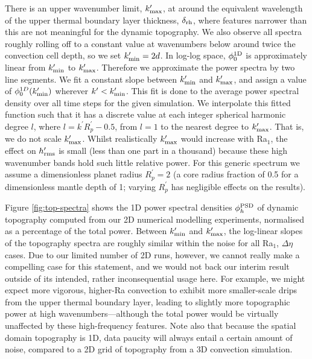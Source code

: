There is an upper wavenumber limit, $k^\prime_{\rm max}$, at around the equivalent wavelength of the upper thermal boundary layer thickness, $\delta_{\rm rh}$, where features narrower than this are not meaningful for the dynamic topography. We also observe all spectra roughly rolling off to a constant value at wavenumbers below around twice the convection cell depth, so we set $k_{\rm min}^\prime = 2d$. In log-log space, $\phi^{\rm 1D}_0$ is approximately linear from $k_{\rm min}^\prime$ to $k^\prime_{\rm max}$. Therefore we approximate the power spectra by two line segments. We fit a constant slope between $k^\prime_{\rm min}$ and $k^\prime_{\rm max}$, and assign a value of $\phi^{1D}_0(k^\prime_{\rm min})$ wherever $k^\prime < k^\prime_{\rm min}$. This fit is done to the average power spectral density over all time steps for the given simulation. We interpolate this fitted function such that it has a discrete value at each integer spherical harmonic degree $l$, where $l = k^\prime R_p^\prime - 0.5$, from $l=1$ to the nearest degree to $k^\prime_{\rm max}$. That is, we do not scale $k^\prime_{\rm max}$. Whilst realistically $k^\prime_{\rm max}$ would increase with Ra$_1$, the effect on $h_{\rm rms}^\prime$ is small (less than one part in a thousand) because these high wavenumber bands hold such little relative power. For this generic spectrum we assume a dimensionless planet radius $R_p^\prime = 2$ (a core radius fraction of 0.5 for a dimensionless mantle depth of 1; varying $R_p^\prime$ has negligible effects on the results).


Figure \ref{fig:top-spectra} shows the 1D power spectral densities $\phi^{\rm PSD}_h$ of dynamic topography computed from our 2D numerical modelling experiments, normalised as a percentage of the total power. Between $k_{\rm min}^\prime$ and $k_{\rm max}^\prime$, the log-linear slopes of the topography spectra are roughly similar within the noise for all Ra$_1$, $\Delta \eta$ cases. Due to our limited number of 2D runs, however, we cannot really make a compelling case for this statement, and we would not back our interim result outside of its intended, rather inconsequential usage here. For example, we might expect more vigorous, higher-Ra convection to exhibit more smaller-scale drips from the upper thermal boundary layer, leading to slightly more topographic power at high wavenumbers---although the total power would be virtually unaffected by these high-frequency features. Note also that because the spatial domain topography is 1D, data paucity will always entail a certain amount of noise, compared to a 2D grid of topography from a 3D convection simulation.

